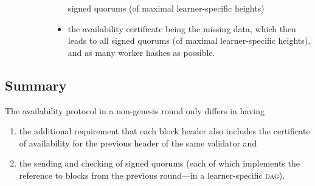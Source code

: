 \documentclass[%
dvipsnames]{article}
\theoremstyle{definition}
\newcommand{\xnote}[1]{
  \marginnote{\footnotesize #1}%
}
\newcommand{\Dag}[1][]{\textsc{dag}#1\xspace}
\newcommand{\ie}[1][, ]{\emph{i.e.}#1}
\begin{document}
\begin{description}
\begin{description}
\begin{itemize}
      signed quorums (of maximal learner-specific heights)
    \item the availability certificate being the missing data,
      which then leads to all
      signed quorums (of maximal learner-specific heights),
      and as many worker hashes as possible. 
    \end{itemize}
  \end{description}


\end{description}



\subsection{Summary}
The availability protocol in a non-genesis round
only differs in having
\begin{enumerate}
\item the additional requirement
that each block header also includes
the certificate of availability
for the previous header of the same validator and
\item
the sending and checking of signed quorums
(each of which implements the reference to
blocks from the previous round—in a learner-specific \Dag).
\end{enumerate}
\end{document}
